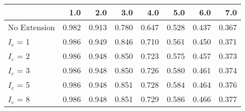 \begin{tabular}{lrrrrrrr}
\toprule
{} &   1.0 &   2.0 &   3.0 &   4.0 &   5.0 &   6.0 &   7.0 \\
\midrule
No Extension & 0.982 & 0.913 & 0.780 & 0.647 & 0.528 & 0.437 & 0.367 \\
$I_c$ = 1    & 0.986 & 0.949 & 0.846 & 0.710 & 0.561 & 0.450 & 0.371 \\
$I_c$ = 2    & 0.986 & 0.948 & 0.850 & 0.723 & 0.575 & 0.457 & 0.373 \\
$I_c$ = 3    & 0.986 & 0.948 & 0.850 & 0.726 & 0.580 & 0.461 & 0.374 \\
$I_c$ = 5    & 0.986 & 0.948 & 0.851 & 0.728 & 0.584 & 0.464 & 0.376 \\
$I_c$ = 8    & 0.986 & 0.948 & 0.851 & 0.729 & 0.586 & 0.466 & 0.377 \\
\bottomrule
\end{tabular}
